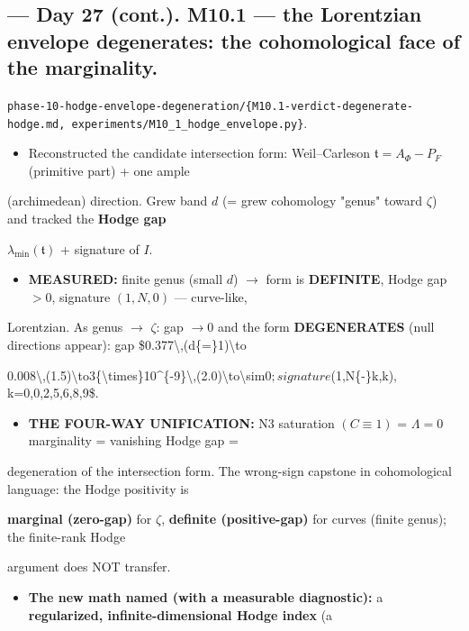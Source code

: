 \documentclass[10pt]{article}
\begin{document}
\subsection*{ --- Day 27 (cont.). M10.1 --- the Lorentzian envelope degenerates: the cohomological face of the marginality.}
\texttt{phase-10-hodge-envelope-degeneration/\{M10.1-verdict-degenerate-hodge.md, experiments/M10\_1\_hodge\_envelope.py\}}.\par
\begin{itemize}
\item Reconstructed the candidate intersection form: Weil--Carleson $\mathfrak t=A_\Phi-P_F$ (primitive part) + one ample
\end{itemize}
  (archimedean) direction. Grew band $d$ (= grew cohomology "genus" toward \ensuremath{\zeta}) and tracked the \textbf{Hodge gap}\par
  $\lambda_{\min}(\mathfrak t)$ + signature of $I$.\par
\begin{itemize}
\item \textbf{MEASURED:} finite genus (small $d$) \ensuremath{\to} form is \textbf{DEFINITE}, Hodge gap $>0$, signature $(1,N,0)$ --- curve-like,
\end{itemize}
  Lorentzian. As genus \ensuremath{\to} \ensuremath{\zeta}: gap $\to0$ and the form \textbf{DEGENERATES} (null directions appear): gap \$0.377\textbackslash{},(d\{=\}1)\textbackslash{}to\par
  0.008\textbackslash{},(1.5)\textbackslash{}to3\{\textbackslash{}times\}10\textasciicircum{}\{-9\}\textbackslash{},(2.0)\textbackslash{}to\textbackslash{}sim0$; signature $(1,N\{-\}k,k)$, $k=0,0,2,5,6,8,9\$.\par
\begin{itemize}
\item \textbf{THE FOUR-WAY UNIFICATION:} N3 saturation $(C\equiv1)$ = $\Lambda=0$ marginality = vanishing Hodge gap =
\end{itemize}
  degeneration of the intersection form. The wrong-sign capstone in cohomological language: the Hodge positivity is\par
  \textbf{marginal (zero-gap)} for \ensuremath{\zeta}, \textbf{definite (positive-gap)} for curves (finite genus); the finite-rank Hodge\par
  argument does NOT transfer.\par
\begin{itemize}
\item \textbf{The new math named (with a measurable diagnostic):} a \textbf{regularized, infinite-dimensional Hodge index} (a
\end{itemize}
\end{document}
